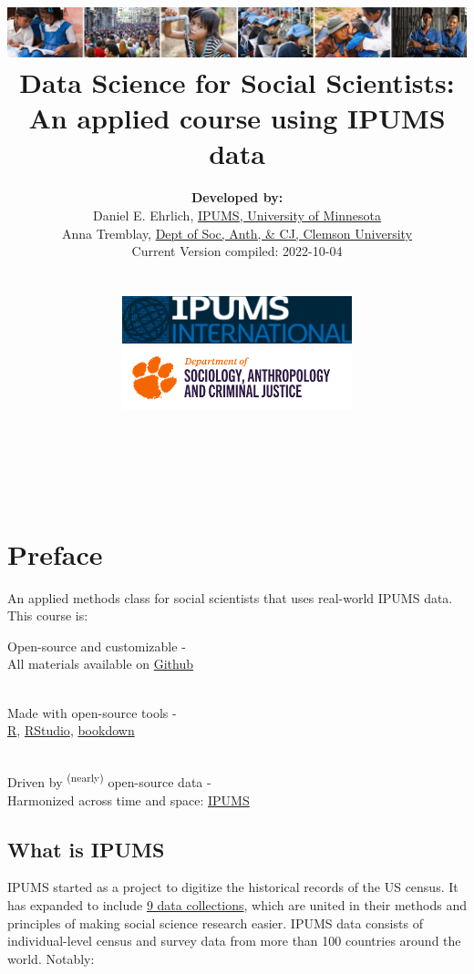 \documentclass[
]{book}
\title{\includegraphics{ipums_banner.png}\\
Data Science for Social Scientists:\\
An applied course using IPUMS data }
\author{\textbf{Developed by:}\\
\hspace*{0.333em}\hspace*{0.333em}Daniel E. Ehrlich, \href{https://international.ipums.org/international/}{IPUMS, University of Minnesota}\\
\hspace*{0.333em}\hspace*{0.333em}Anna Tremblay, \href{https://www.clemson.edu/cbshs/departments/sacj/degrees/anthropology.html}{Dept of Soc, Anth, \& CJ, Clemson University}\\
\hspace*{0.333em}\hspace*{0.333em}Current Version compiled: 2022-10-04\\
\strut \\
\includegraphics[width=0.5\textwidth,height=\textheight]{ipums_i_logo.jpg}\\
\includegraphics[width=0.5\textwidth,height=\textheight]{clemson_logo.png}\\
\strut \\
\strut \\}
\date{}
\begin{document}
\maketitle

{
\setcounter{tocdepth}{1}
\tableofcontents
}
\hypertarget{preface}{%
\chapter*{Preface}\label{preface}}

An applied methods class for social scientists that uses real-world IPUMS data. This course is:

Open-source and customizable -\\
\hspace*{0.333em}\hspace*{0.333em}\hspace*{0.333em}All materials available on \href{https://github.com/ehrlichd/stats_book}{Github}\\
\strut \\
Made with open-source tools -\\
\hspace*{0.333em}\hspace*{0.333em}\href{https://cran.r-project.org/}{R}, \href{https://www.rstudio.com/products/rstudio/}{RStudio}, \href{https://bookdown.org/}{bookdown}\\
\strut \\
Driven by \textsuperscript{(nearly)} open-source data -\\
\hspace*{0.333em}\hspace*{0.333em}Harmonized across time and space: \href{https://ipums.org}{IPUMS}\\

\hypertarget{what-is-ipums}{%
\section*{What is IPUMS}\label{what-is-ipums}}

IPUMS started as a project to digitize the historical records of the US census. It has expanded to include \href{https://www.ipums.org/}{9 data collections}, which are united in their methods and principles of making social science research easier. IPUMS data consists of individual-level census and survey data from more than 100 countries around the world. Notably:
\end{document}
